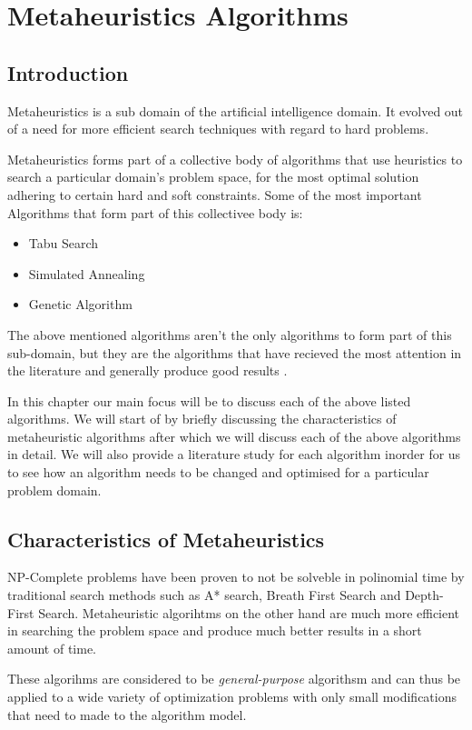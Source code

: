 \chapter{Metaheuristics Algorithms}

\section{Introduction}
Metaheuristics is a sub domain of the artificial intelligence domain. It evolved out of a need for more efficient search techniques with regard to hard problems. 

Metaheuristics forms part of a collective body of algorithms that use heuristics to search a particular domain's problem space, for the most optimal solution adhering to certain hard and soft constraints. Some of the most important Algorithms that form part of this collectivee body is:
\begin{itemize}
\item Tabu Search
\item Simulated Annealing
\item Genetic Algorithm
\end{itemize}
The above mentioned algorithms aren't the only algorithms to form part of this sub-domain, but they are the algorithms that have recieved the most attention in the literature and generally produce good results \cite{SweepMeta}.

In this chapter our main focus will be to discuss each of the above listed algorithms. We will start of by briefly discussing the characteristics of metaheuristic algorithms after which we will discuss each of the above algorithms in detail. We will also provide a literature study for each algorithm inorder for us to see how an algorithm needs to be changed and optimised for a particular problem domain. 

\section{Characteristics of Metaheuristics}
NP-Complete problems have been proven to not be solveble in polinomial time by traditional search methods such as A* search, Breath First Search and Depth-First Search. Metaheuristic algorihtms on the other hand are much more efficient in searching the problem space and produce much better results in a short amount of time. 

These algorihms are considered to be \emph{general-purpose} algorithsm and can thus be applied to a wide variety of optimization problems with only small modifications that need to made to the algorithm model\cite{MetaGraph}.

